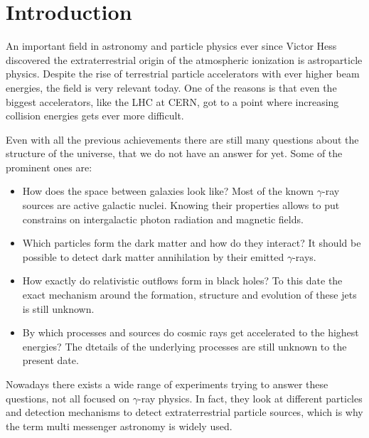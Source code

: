 \chapter{Introduction}
An important field in astronomy and particle physics ever since Victor Hess discovered
the extraterrestrial origin of the atmospheric ionization
is astroparticle physics. Despite the rise
of terrestrial particle accelerators with ever higher beam energies,
the field is very relevant today. One of the reasons is that
even the biggest accelerators, like the LHC at CERN, got to a point where
increasing collision energies gets ever more difficult.

Even with all the previous achievements
there are still many questions about the structure of the universe, that we 
do not have an answer for yet.
Some of the prominent ones are:
\begin{itemize}
    \item{How does the space between galaxies look like? 
		Most of the known $\gamma$-ray sources are active galactic nuclei. 
		Knowing their properties allows to put constrains on
		intergalactic photon radiation and magnetic fields.}
    \item{Which particles form the dark matter and how do they interact? 
		It should be possible to detect dark matter annihilation by their emitted $\gamma$-rays.}
    \item{How exactly do relativistic outflows form in black holes?
		To this date the exact mechanism around the formation, structure and evolution of these
		jets is still unknown.}
    \item{By which processes and sources do cosmic rays get accelerated to the highest energies?
		The dtetails of the underlying processes are still unknown to the present date.}
\end{itemize}

Nowadays there exists a wide range of experiments trying to
answer these questions, not all focused on 
$\gamma$-ray physics.
In fact, they look at different particles and detection
mechanisms to detect
extraterrestrial particle sources, which is why
the term multi messenger astronomy is widely used.

